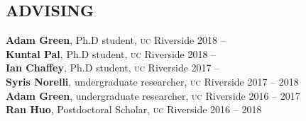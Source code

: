 \documentclass[margin,line]{resume}
\newcommand{\scap}[1]{\textsc{\MakeLowercase{#1}}}
\begin{document}
\begin{resume}
\section{\footnotesize \sc
\sffamily 
{}ADVISING
}

\textbf{Adam Green}, Ph.D student, \scap{UC} Riverside
 \hfill {2018 -- \phantom{2017}}\\
%
\textbf{Kuntal Pal}, Ph.D student, \scap{UC} Riverside
 \hfill {2018 -- \phantom{2017}}\\
%
\textbf{Ian Chaffey}, Ph.D student, \scap{UC} Riverside
 \hfill {2017 -- \phantom{2017}}\\
%
\textbf{Syris Norelli}, undergraduate researcher, \scap{UC} Riverside
 \hfill {2017 -- 2018}\\
%
\textbf{Adam Green}, undergraduate researcher, \scap{UC} Riverside
 \hfill {2016 -- {2017}}\\
%
\textbf{Ran Huo}, Postdoctoral Scholar, \scap{UC} Riverside
 \hfill {2016 -- 2018}\\






\end{resume}
\end{document}
